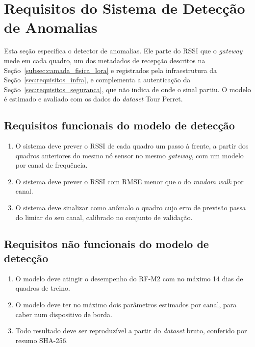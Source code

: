 \section{Requisitos do Sistema de Detecção de Anomalias}
\label{sec:requisitos_ml}

Esta seção especifica o detector de anomalias. Ele parte do RSSI que o
\textit{gateway} mede em cada quadro, um dos metadados de recepção descritos na
Seção~\ref{subsec:camada_fisica_lora} e registrados pela infraestrutura da
Seção~\ref{sec:requisitos_infra}, e complementa a autenticação da
Seção~\ref{sec:requisitos_seguranca}, que não indica de onde o sinal partiu. O
modelo é estimado e avaliado com os dados do \textit{dataset} Tour Perret.


\subsection{Requisitos funcionais do modelo de detecção}

\begin{enumerate}

    \item[RF-M1.] O sistema deve prever o RSSI de cada quadro um passo à frente,
    a partir dos quadros anteriores do mesmo nó sensor no mesmo
    \textit{gateway}, com um modelo por canal de frequência.

    \item[RF-M2.] O sistema deve prever o RSSI com RMSE menor que o do
    \textit{random walk} por canal.

    \item[RF-M3.] O sistema deve sinalizar como anômalo o quadro cujo erro de
    previsão passa do limiar do seu canal, calibrado no conjunto de validação.

\end{enumerate}


\subsection{Requisitos não funcionais do modelo de detecção}

\begin{enumerate}

    \item[RNF-M1.] O modelo deve atingir o desempenho do RF-M2 com no máximo 14
    dias de quadros de treino.

    \item[RNF-M2.] O modelo deve ter no máximo dois parâmetros estimados por
    canal, para caber num dispositivo de borda.

    \item[RNF-M3.] Todo resultado deve ser reproduzível a partir do
    \textit{dataset} bruto, conferido por resumo SHA-256.

\end{enumerate}


